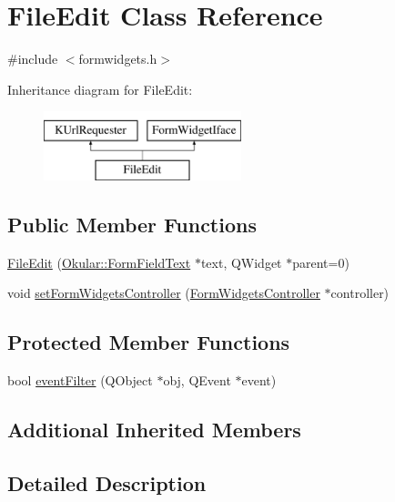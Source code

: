 \hypertarget{classFileEdit}{\section{File\+Edit Class Reference}
\label{classFileEdit}
}


{\ttfamily \#include $<$formwidgets.\+h$>$}

Inheritance diagram for File\+Edit\+:\begin{figure}[H]
\begin{center}
\leavevmode
\includegraphics[height=2.000000cm]{classFileEdit}
\end{center}
\end{figure}
\subsection*{Public Member Functions}
\begin{DoxyCompactItemize}
\item 
\hyperlink{classFileEdit_aa173053a6d7f6805ac45b362087db877}{File\+Edit} (\hyperlink{classOkular_1_1FormFieldText}{Okular\+::\+Form\+Field\+Text} $\ast$text, Q\+Widget $\ast$parent=0)
\item 
void \hyperlink{classFileEdit_a3a0c99a7ff85c3efadf02890eff1e6c4}{set\+Form\+Widgets\+Controller} (\hyperlink{classFormWidgetsController}{Form\+Widgets\+Controller} $\ast$controller)
\end{DoxyCompactItemize}
\subsection*{Protected Member Functions}
\begin{DoxyCompactItemize}
\item 
bool \hyperlink{classFileEdit_acb157a7dc72ff84ee9de32b2166f1ea4}{event\+Filter} (Q\+Object $\ast$obj, Q\+Event $\ast$event)
\end{DoxyCompactItemize}
\subsection*{Additional Inherited Members}


\subsection{Detailed Description}


